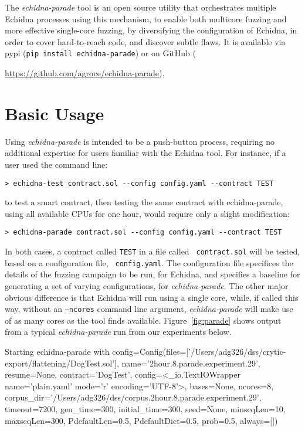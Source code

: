 \documentclass[sigconf]{acmart}
\begin{document}
The \emph{echidna-parade} tool is an open source utility that orchestrates multiple
Echidna processes using this mechanism, to enable both multicore
fuzzing and more effective single-core fuzzing, by diversifying the
configuration of Echidna, in order to cover hard-to-reach code, and
discover subtle flaws. It is available via pypi ({\tt pip
    install echidna-parade}) or on GitHub
({\url{https://github.com/agroce/echidna-parade}).

\section{Basic Usage}

Using \emph{echidna-parade} is intended to be a push-button process,
requiring no additional expertise for users familiar with the Echidna
tool.  For instance, if a user used the command line:

{\scriptsize
\begin{verbatim}
> echidna-test contract.sol --config config.yaml --contract TEST
\end{verbatim}
  }

\noindent to test a smart contract, then testing the same contract with echidna-parade, using all
available CPUs for one hour, would require only a slight modification:

{\scriptsize
\begin{verbatim}
> echidna-parade contract.sol --config config.yaml --contract TEST
\end{verbatim}
  }

In both cases, a contract called {\tt TEST} in a file called {\tt
  contract.sol} will be tested, based on a configuration file, {\tt
  config.yaml}.  The configuration file specifices the details of the
fuzzing campaign to be run, for Echidna, and specifies a baseline for
generating a set of varying configurations, for
\emph{echidna-parade}.  The other major obvious difference is that Echidna
will run using a single core, while, if called this way, without an
{\tt --ncores} command line argument,
\emph{echidna-parade} will make use of as many cores as the tool
finds available.  Figure~\ref{fig:parade} shows output from a typical
\emph{echidna-parade} run from our experiments below.

\begin{figure*}
  {\scriptsize
    \begin{code}
Starting echidna-parade with
config=Config(files=['/Users/adg326/dss/crytic-export/flattening/DogTest.sol'],
  name='2hour.8.parade.experiment.29', resume=None, contract='DogTest',
  config=<\_io.TextIOWrapper name='plain.yaml' mode='r' encoding='UTF-8'>, bases=None, ncores=8,
  corpus\_dir='/Users/adg326/dss/corpus.2hour.8.parade.experiment.29', timeout=7200,
  gen\_time=300, initial\_time=300, seed=None, minseqLen=10,
  maxseqLen=300, PdefaultLen=0.5, PdefaultDict=0.5,
  prob=0.5, always=[])


\end{code}}
\end{figure*}}
\end{document}
